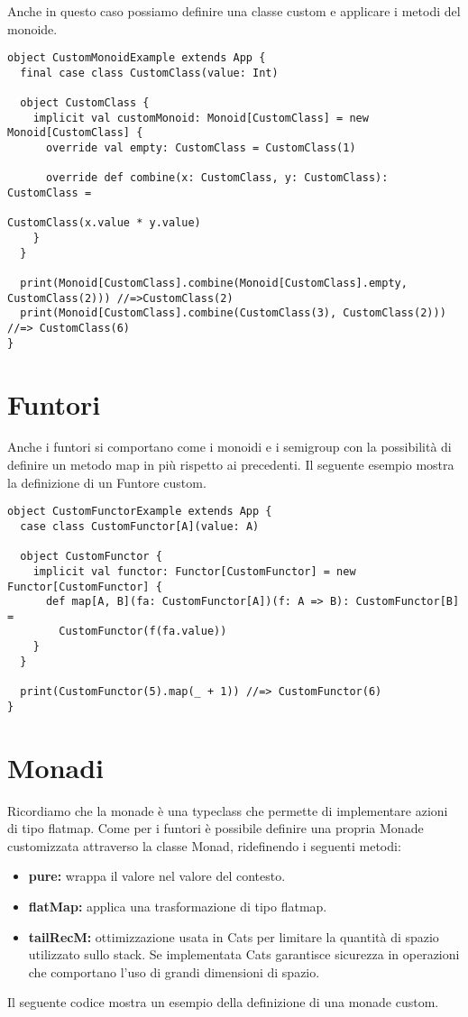 \noindent Anche in questo caso possiamo definire una classe custom e applicare i metodi del monoide.
\begin{verbatim}
object CustomMonoidExample extends App {
  final case class CustomClass(value: Int)

  object CustomClass {
    implicit val customMonoid: Monoid[CustomClass] = new Monoid[CustomClass] {
      override val empty: CustomClass = CustomClass(1)

      override def combine(x: CustomClass, y: CustomClass): CustomClass = 
                                                            CustomClass(x.value * y.value)
    }
  }

  print(Monoid[CustomClass].combine(Monoid[CustomClass].empty, CustomClass(2))) //=>CustomClass(2)
  print(Monoid[CustomClass].combine(CustomClass(3), CustomClass(2))) //=> CustomClass(6)
}
\end{verbatim}

\section{Funtori}
Anche i funtori si comportano come i monoidi e i semigroup con la possibilità di definire un metodo map in più rispetto ai precedenti. Il seguente esempio mostra la definizione di un Funtore custom.

\begin{verbatim}
object CustomFunctorExample extends App {
  case class CustomFunctor[A](value: A)

  object CustomFunctor {
    implicit val functor: Functor[CustomFunctor] = new Functor[CustomFunctor] {
      def map[A, B](fa: CustomFunctor[A])(f: A => B): CustomFunctor[B] =
        CustomFunctor(f(fa.value))
    }
  }

  print(CustomFunctor(5).map(_ + 1)) //=> CustomFunctor(6)
}
\end{verbatim}

\section{Monadi}
Ricordiamo che la monade è una typeclass che permette di implementare azioni di tipo flatmap. Come per i funtori è possibile definire una propria Monade customizzata attraverso la classe Monad, ridefinendo i seguenti metodi:
\begin{itemize}
    \item \textbf{pure:} wrappa il valore nel valore del contesto.
    \item \textbf{flatMap:} applica una trasformazione di tipo flatmap.
    \item \textbf{tailRecM:} ottimizzazione usata in Cats per limitare la quantità di spazio utilizzato sullo stack. Se implementata Cats garantisce sicurezza in operazioni che comportano l'uso di grandi dimensioni di spazio.
\end{itemize}
\noindent Il seguente codice mostra un esempio della definizione di una monade custom.

